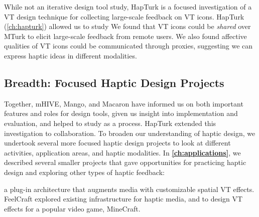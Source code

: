 	While not an iterative design tool study, HapTurk is a focused investigation of a VT design technique for collecting large-scale feedback on VT icons.
	HapTurk (\autoref{ch:hapturk}) allowed us to study 
	We found that VT icons could be \emph{shared} over MTurk to elicit large-scale feedback from remote users.
	We also found affective qualities of VT icons could be communicated through proxies, suggesting we can express haptic ideas in different modalities.


\subsection{Breadth: Focused Haptic Design Projects}
\label{ch:conclusion:approach:breadth}
Together, mHIVE, Mango, and Macaron have informed us on both important features and roles for design tools, given us insight into implementation and evaluation, and helped to study \haxd as a process.
HapTurk extended this investigation to collaboration.
To broaden our understanding of haptic design, we undertook several more focused haptic design projects to look at different activities, application areas, and haptic modalities.
In \textbf{\autoref{ch:applications}}, we described several smaller projects that gave opportunities for practicing haptic design and exploring other types of haptic feedback:

  a plug-in architecture that augments media with customizable spatial VT effects.
	FeelCraft explored existing infrastructure for haptic media, and to design VT effects for a popular video game, MineCraft.
	

